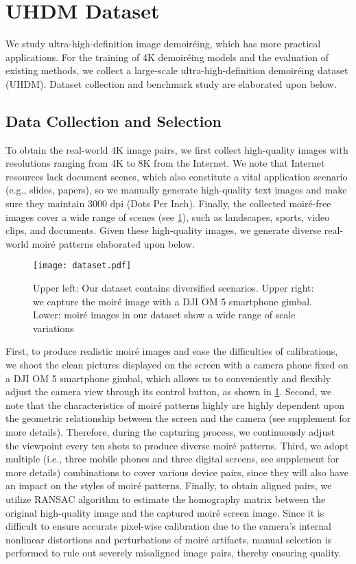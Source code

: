 \documentclass[runningheads]{llncs}
\newcommand{\ie}{i.e.}
\newcommand{\eg}{e.g.}
\begin{document}
  


\section{UHDM Dataset}
\label{sec:dataset}
We study ultra-high-definition image demoiréing, which has more practical applications. For the training of 4K demoiréing models and the evaluation of existing methods, we collect a large-scale ultra-high-definition demoiréing dataset (UHDM). Dataset collection and benchmark study are elaborated upon below.


\subsection{Data Collection and Selection}
To obtain the real-world 4K image pairs, we first collect high-quality images with resolutions ranging from 4K to 8K from the Internet.
We note that Internet resources lack document scenes, which also constitute a vital application scenario (\eg, slides, papers), so we manually generate high-quality text images and make sure they maintain 3000 dpi (Dots Per Inch). 
Finally, the collected moiré-free images cover a wide range of scenes (see \cref{fig:dataset}), such as landscapes, sports, video clips, and documents. 
Given these high-quality images, we generate diverse real-world moiré patterns elaborated upon below.


\begin{figure}[t]\centering
  \texttt{[image: dataset.pdf]}
  \caption{Upper left: Our dataset contains diversified scenarios. Upper right: we capture the moiré image with a DJI OM 5 smartphone gimbal. Lower: moiré images in our dataset show a wide range of scale variations}
  \label{fig:dataset} 
\end{figure}


First, to produce realistic moiré images and ease the difficulties of calibrations, 
we shoot the clean pictures displayed on the screen with a camera phone fixed on a DJI OM 5 smartphone gimbal, which allows us to conveniently and flexibly adjust the camera view through its control button, as shown in \cref{fig:dataset}. 
Second, we note that the characteristics of moiré patterns highly are highly dependent upon the geometric relationship between the screen and the camera (see supplement for more details). 
Therefore, during the capturing process, we continuously adjust the viewpoint every ten shots to produce diverse moiré patterns. Third, we adopt multiple  (\ie, three mobile phones and three digital screens, see supplement for more details) combinations to cover various device pairs, since they will also have an impact on the styles of moiré patterns.
Finally, to obtain aligned pairs, we utilize RANSAC algorithm \cite{vedaldi2010vlfeat} to estimate the homography matrix between the original high-quality image and the captured moiré screen image. Since it is difficult to ensure accurate pixel-wise calibration due to the camera's internal nonlinear distortions and perturbations of moiré artifacts, manual selection is performed to rule out severely misaligned image pairs, thereby ensuring quality.
\end{document}
